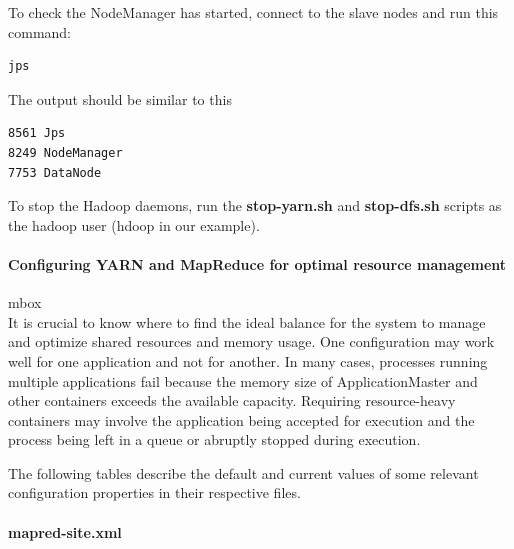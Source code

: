 \documentclass[12pt,english]{book}
\begin{document}
To check the NodeManager has started, connect to the slave nodes and run this command:
\begin{lstlisting}[language=bash, frame=single]
jps
\end{lstlisting}
The output should be similar to this
\begin{lstlisting}[language=bash, frame=single]
8561 Jps
8249 NodeManager
7753 DataNode
\end{lstlisting}

To stop the Hadoop daemons, run the \textbf{stop-yarn.sh} and \textbf{stop-dfs.sh} scripts as the hadoop user (hdoop in our example).


\paragraph{Configuring YARN and MapReduce for optimal resource management}mbox{}\\


It is crucial to know where to find the ideal balance for the system to manage and optimize shared resources and memory usage.
One configuration may work well for one application and not for another.
In many cases, processes running multiple applications fail because the memory size of ApplicationMaster and other containers exceeds the available capacity.
Requiring resource-heavy containers may involve the application being accepted for execution and the process being left in a queue or abruptly stopped during execution.

The following tables describe the default and current values of some relevant configuration properties in their respective files. 

\paragraph{mapred-site.xml}\mbox{}\\
\end{document}
